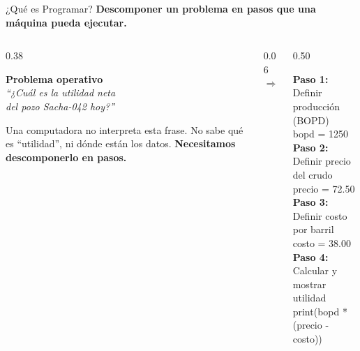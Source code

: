 \documentclass[aspectratio=169, 11pt]{beamer}
\begin{document}
\begin{frame}{¿Qué es Programar?}
  \vspace{-6pt}
  {\small\color{arcaDark}\bfseries
    Descomponer un problema en pasos que una máquina pueda ejecutar.}

  \vspace{4pt}
  \begin{columns}[T]
    \begin{column}{0.38\textwidth}
      \begin{tcolorbox}[
        colback=arcaDark, colframe=arcaDark, boxrule=0pt,
        arc=4pt, left=6pt, right=6pt, top=5pt, bottom=5pt
      ]
        {\scriptsize\color{white}\bfseries\faIndustry\hspace{4pt}Problema operativo}\\[3pt]
        {\scriptsize\color{white!85}\itshape
        ``¿Cuál es la utilidad neta\\
        del pozo Sacha-042 hoy?''}
      \end{tcolorbox}

      \vspace{4pt}
      {\scriptsize\color{textMuted}
        Una computadora no interpreta esta frase.
        No sabe qué es ``utilidad'', ni dónde están los datos.
        \textbf{Necesitamos descomponerlo en pasos.}}
    \end{column}

    \begin{column}{0.06\textwidth}
      \centering
      \vspace{20pt}
      {\Large\color{arcaRed}$\Rightarrow$}
    \end{column}

    \begin{column}{0.50\textwidth}
      \begin{tcolorbox}[
        colback=arcaGray, colframe=arcaRed, boxrule=0pt, leftrule=3pt,
        arc=3pt, left=5pt, right=5pt, top=4pt, bottom=4pt
      ]
        {\scriptsize\color{arcaRed}\bfseries Paso 1:} {\scriptsize Definir producción (BOPD)}\\
        {\scriptsize\ttfamily\color{textDark} bopd = 1250}\\[3pt]
        {\scriptsize\color{arcaRed}\bfseries Paso 2:} {\scriptsize Definir precio del crudo}\\
        {\scriptsize\ttfamily\color{textDark} precio = 72.50}\\[3pt]
        {\scriptsize\color{arcaRed}\bfseries Paso 3:} {\scriptsize Definir costo por barril}\\
        {\scriptsize\ttfamily\color{textDark} costo = 38.00}\\[3pt]
        {\scriptsize\color{arcaRed}\bfseries Paso 4:} {\scriptsize Calcular y mostrar utilidad}\\
        {\scriptsize\ttfamily\color{textDark} print(bopd * (precio - costo))}
      \end{tcolorbox}
    \end{column}
  \end{columns}


\end{frame}
\end{document}
